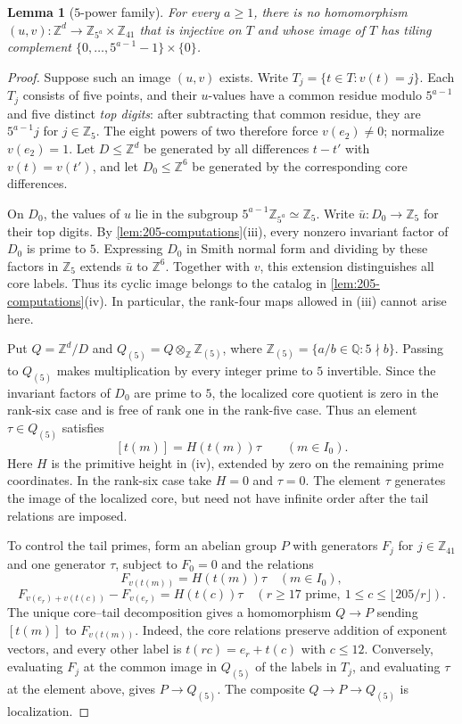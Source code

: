 \documentclass[11pt,reqno]{amsart}
\newcommand{\Z}{\mathbb Z}
\newcommand{\Q}{\mathbb Q}
\newtheorem{lemma}[theorem]{Lemma}
\theoremstyle{definition}
\theoremstyle{remark}
\numberwithin{equation}{section}
\begin{document}
\begin{lemma}[$5$-power family]\label{lem:205-5-family}
For every $a\ge1$, there is no homomorphism
$(u,v):\Z^d\to\Z_{5^a}\times\Z_{41}$ that is injective on $T$ and
whose image of $T$ has tiling complement
$\{0,\ldots,5^{a-1}-1\}\times\{0\}$.
\end{lemma}

\begin{proof}
Suppose such an image $(u,v)$ exists.
Write $T_j=\{t\in T:v(t)=j\}$. Each $T_j$ consists of five points,
and their $u$-values have a common residue modulo $5^{a-1}$ and
five distinct \emph{top digits}: after subtracting that common residue,
they are $5^{a-1}j$ for $j\in\Z_5$. The eight powers of two therefore force
$v(e_2)\ne0$; normalize $v(e_2)=1$.
Let $D\le\Z^d$ be generated by all differences $t-t'$ with
$v(t)=v(t')$, and let $D_0\le\Z^6$ be generated by the corresponding
core differences.

On $D_0$, the values of $u$ lie in the subgroup
$5^{a-1}\Z_{5^a}\simeq\Z_5$.
Write $\bar u:D_0\to\Z_5$ for their top digits.
By \cref{lem:205-computations}(iii), every nonzero invariant factor
of $D_0$ is prime to $5$. Expressing $D_0$ in Smith normal form and
dividing by these factors in $\Z_5$ extends $\bar u$ to $\Z^6$.
Together with $v$, this extension distinguishes all core labels.
Thus its cyclic image belongs to the catalog in
\cref{lem:205-computations}(iv). In particular, the rank-four maps
allowed in (iii) cannot arise here.

Put $Q=\Z^d/D$ and
$Q_{(5)}=Q\otimes_{\Z}\Z_{(5)}$, where
$\Z_{(5)}=\{a/b\in\Q:5\nmid b\}$.
Passing to $Q_{(5)}$ makes multiplication by every integer prime to
$5$ invertible. Since the invariant factors of $D_0$ are prime to $5$,
the localized core quotient is zero in the rank-six case and is free
of rank one in the rank-five case. Thus an element $\tau\in Q_{(5)}$ satisfies
\[
 [t(m)]=H(t(m))\tau\qquad(m\in I_0).
\]
Here $H$ is the primitive height in (iv), extended by zero on the
remaining prime coordinates. In the rank-six case take $H=0$ and
$\tau=0$. The element $\tau$ generates the image of the localized core, but
need not have infinite order after the tail relations are imposed.

To control the tail primes, form an abelian group $P$ with generators
$F_j$ for $j\in\Z_{41}$ and one generator $\tau$, subject to $F_0=0$
and the relations
\[
 F_{v(t(m))}=H(t(m))\tau\quad(m\in I_0),
\]
\[
 F_{v(e_r)+v(t(c))}-F_{v(e_r)}=H(t(c))\tau
 \quad\left(r\ge17\text{ prime},\ 1\le c\le\lfloor205/r\rfloor\right).
\]
The unique core--tail decomposition gives a homomorphism
$Q\to P$ sending $[t(m)]$ to $F_{v(t(m))}$.
Indeed, the core relations preserve addition of exponent vectors,
and every other label is $t(rc)=e_r+t(c)$ with $c\le12$.
Conversely, evaluating $F_j$ at the common image in $Q_{(5)}$ of the
labels in $T_j$, and evaluating $\tau$ at the element above, gives
$P\to Q_{(5)}$. The composite $Q\to P\to Q_{(5)}$ is localization.


\end{proof}
\end{document}

